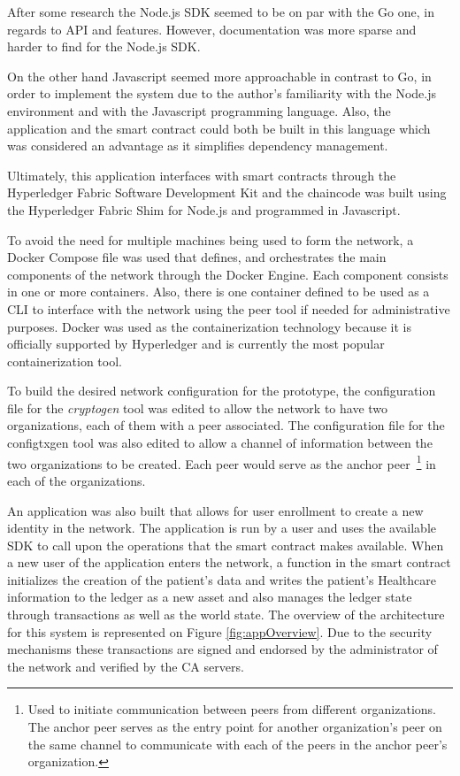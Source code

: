 After some research the Node.js SDK seemed to be on par with the Go one, in
regards to API and features. However, documentation was more sparse and harder
to find for the Node.js SDK. 

On the other hand Javascript seemed more approachable in contrast to Go, in
order to implement the system due to the author's familiarity with the Node.js
environment and with the Javascript programming language. Also, the application
and the smart contract could both be built in this language which was
considered an advantage as it simplifies dependency management. 

Ultimately, this application interfaces with smart contracts through the
Hyperledger Fabric Software Development Kit and the chaincode was built using
the Hyperledger Fabric Shim for Node.js and programmed in Javascript.

To avoid the need for multiple machines being used to form the network, a
Docker Compose file was used that defines, and orchestrates the main components
of the network through the Docker Engine. Each component consists in one or
more containers. Also, there is one  container defined to be used as a CLI to
interface with the network using the peer tool if needed for administrative
purposes. Docker was used as the containerization technology because it is
officially supported by Hyperledger and is currently the most popular
containerization tool.

To build the desired network configuration for the prototype, the configuration
file for the \textit{cryptogen} tool was edited to allow the network to have
two organizations, each of them with a peer associated. The configuration file
for the configtxgen tool was also edited to allow a channel of information
between the two organizations to be created. Each peer would serve as the
anchor peer~\footnote{Used to initiate communication between peers from
different organizations. The anchor peer serves as the entry point for another
organization’s peer on the same channel to communicate with each of the peers
in the anchor peer’s organization.} in each of the organizations.

An application was also built that allows for user enrollment to create a new
identity in the network. The application is run by a user and uses the
available SDK to call upon the operations that the smart contract makes
available. When a new user of the application enters the network, a function in
the smart contract initializes the creation of the patient's data and writes
the patient's Healthcare information to the ledger as a new asset and also
manages the ledger state through transactions as well as the world state.  The
overview of the architecture for this system is represented on Figure
\ref{fig:appOverview}. Due to the security mechanisms these transactions are
signed and endorsed by the administrator of the network and verified by the CA
servers.

